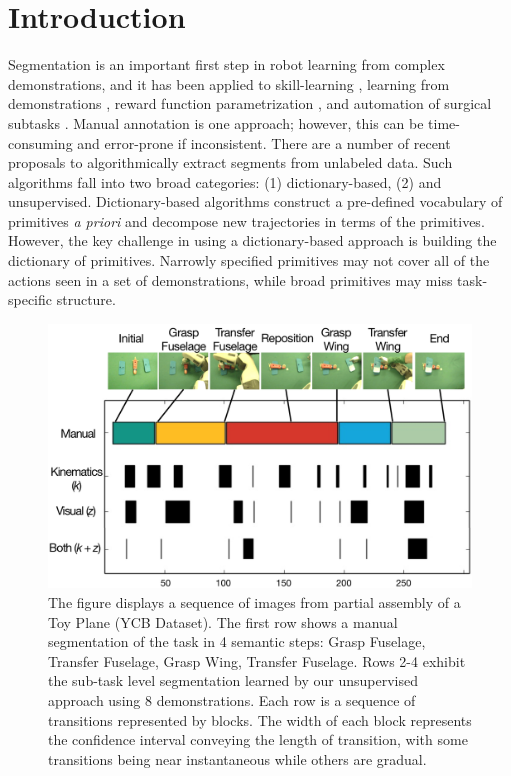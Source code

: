 \documentclass[0-main.tex]{subfiles}
\begin{document}
\section{Introduction}
Segmentation is an important first step in robot learning from complex demonstrations, and it has been applied to skill-learning \cite{calinon2010learning, kruger2010learning, konidaris2011robot}, learning from demonstrations \cite{Niekum2015learning}, reward function parametrization \cite{hanlearning}, and automation of surgical subtasks \cite{murali2015learning}.
Manual annotation is one approach; however, this can be time-consuming and error-prone if inconsistent.
There are a number of recent proposals to algorithmically extract segments from unlabeled data.
Such algorithms fall into two broad categories: (1) dictionary-based, (2) and unsupervised.
Dictionary-based algorithms construct a pre-defined vocabulary of primitives \emph{a priori} and decompose new trajectories in terms of the primitives.
However, the key challenge in using a dictionary-based approach is building the dictionary of primitives. 
Narrowly specified primitives may not cover all of the actions seen in a set of demonstrations, while broad primitives may miss task-specific structure.

\begin{figure}[t!]
\centering
\vspace{-5pt}
\includegraphics[width=\linewidth]{figures/pr2_plane_assembly.png}
\caption{The figure displays a sequence of images from partial assembly of a Toy Plane (YCB Dataset). The first row shows a manual segmentation of the task in 4 semantic steps: Grasp Fuselage, Transfer Fuselage, Grasp Wing, Transfer Fuselage. Rows 2-4 exhibit the sub-task level segmentation learned by our  unsupervised approach using 8 demonstrations. Each row is a sequence of transitions represented by blocks. The width of each block represents the confidence interval conveying the length of transition, with some transitions being near instantaneous while others are gradual.}
\vspace{-15pt} 
\end{figure}
\end{document}

